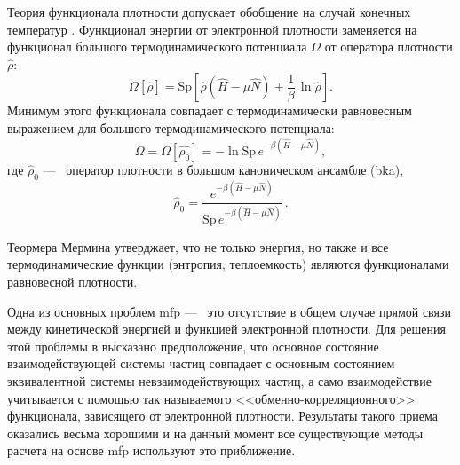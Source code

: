 Теория функционала плотности допускает обобщение на случай конечных температур \cite{mermin:dft-temperatures}.
Функционал энергии от электронной плотности заменяется на функционал большого термодинамического потенциала $\Omega$ от оператора плотности $\hat{\rho}$:
\begin{equation}
    \label{eq:dft:Omega_rho}
    \Omega [\hat{\rho}] = \mathrm{Sp} \left[ \hat{\rho} (\hat{H} - \mu \hat{N}) + \frac{1}{\beta}\, \ln \hat{\rho} \right]. 
\end{equation}
Минимум этого функционала совпадает с термодинамически равновесным выражением для большого термодинамического потенциала:
\begin{equation}
    \label{eq:dft:Omega-min}
    \Omega = \Omega [\hat{\rho_0}] = -\ln \mathrm{Sp}\, e^{-\beta (\hat{H} - \mu \hat{N})}, 
\end{equation}
где $\hat{\rho}_0$ ---~ оператор плотности в большом каноническом ансамбле (\acrshort{bka}),
\begin{equation}
    \label{eq:dft:rho_0-bka}
    \hat{\rho}_0 = \frac{e^{-\beta (\hat{H} - \mu \hat{N})} }{\mathrm{Sp}\, e^{-\beta (\hat{H} - \mu \hat{N})} }\, .
\end{equation}

Теормера Мермина \cite{mermin:dft-temperatures} утверджает, что не только энергия, но также и все термодинамические функции (энтропия, теплоемкость) являются функционалами равновесной плотности.

Одна из основных проблем \acrshort{mfp} ---~ это отсутствие в общем случае прямой связи между кинетической энергией и функцией электронной плотности.
Для решения этой проблемы в \cite{kohn-sham:dft-kinetic-approximation} высказано предположение, что основное состояние взаимодействующей системы частиц совпадает с основным состоянием эквивалентной системы невзаимодействующих частиц, а само взаимодействие учитывается с помощью так называемого <<обменно-корреляционного>> функционала, зависящего от электронной плотности.
Результаты такого приема оказались весьма хорошими и на данный момент все существующие методы расчета на основе \acrshort{mfp} используют это приближение.

